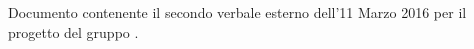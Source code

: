 Documento contenente il secondo verbale esterno dell'11 Marzo 2016 per il progetto \progetto{} del gruppo \gruppo{}.
